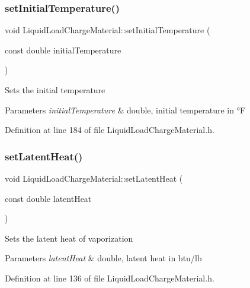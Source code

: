 \subsubsection{\texorpdfstring{set\+Initial\+Temperature()}{setInitialTemperature()}}
{\footnotesize\ttfamily void Liquid\+Load\+Charge\+Material\+::set\+Initial\+Temperature (\begin{DoxyParamCaption}\item[{const double}]{initial\+Temperature }\end{DoxyParamCaption})\hspace{0.3cm}{\ttfamily [inline]}}

Sets the initial temperature 
\begin{DoxyParams}{Parameters}
{\em initial\+Temperature} & double, initial temperature in °F \\
\hline
\end{DoxyParams}


Definition at line 184 of file Liquid\+Load\+Charge\+Material.\+h.

\mbox{\label{class_liquid_load_charge_material_a01d2d23580f27aa9e5cba1124635a677}} 
\subsubsection{\texorpdfstring{set\+Latent\+Heat()}{setLatentHeat()}}
{\footnotesize\ttfamily void Liquid\+Load\+Charge\+Material\+::set\+Latent\+Heat (\begin{DoxyParamCaption}\item[{const double}]{latent\+Heat }\end{DoxyParamCaption})\hspace{0.3cm}{\ttfamily [inline]}}

Sets the latent heat of vaporization 
\begin{DoxyParams}{Parameters}
{\em latent\+Heat} & double, latent heat in btu/lb \\
\hline
\end{DoxyParams}


Definition at line 136 of file Liquid\+Load\+Charge\+Material.\+h.

\mbox{\label{class_liquid_load_charge_material_a9984b8c78a460ef3569fc3ef13eea604}} 
